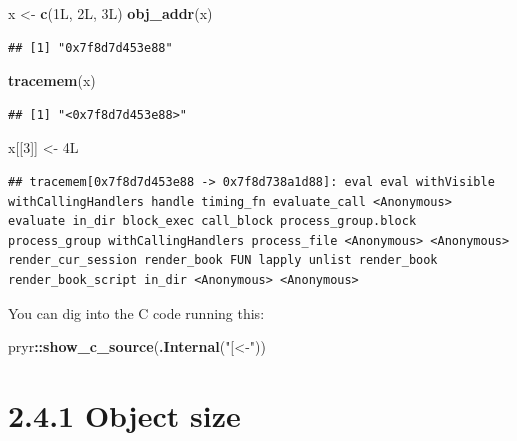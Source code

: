 \documentclass[]{book}
\newenvironment{Shaded}{\begin{snugshade}}{\end{snugshade}}
\newcommand{\DecValTok}[1]{\textcolor[rgb]{0.00,0.00,0.81}{#1}}
\newcommand{\KeywordTok}[1]{\textcolor[rgb]{0.13,0.29,0.53}{\textbf{#1}}}
\newcommand{\NormalTok}[1]{#1}
\newcommand{\OperatorTok}[1]{\textcolor[rgb]{0.81,0.36,0.00}{\textbf{#1}}}
\newcommand{\StringTok}[1]{\textcolor[rgb]{0.31,0.60,0.02}{#1}}
\begin{document}
\begin{Shaded}
\begin{Highlighting}[]
\NormalTok{x <-}\StringTok{ }\KeywordTok{c}\NormalTok{(1L, 2L, 3L)}
\KeywordTok{obj_addr}\NormalTok{(x)}
\end{Highlighting}
\end{Shaded}

\begin{verbatim}
## [1] "0x7f8d7d453e88"
\end{verbatim}

\begin{Shaded}
\begin{Highlighting}[]
\KeywordTok{tracemem}\NormalTok{(x)}
\end{Highlighting}
\end{Shaded}

\begin{verbatim}
## [1] "<0x7f8d7d453e88>"
\end{verbatim}

\begin{Shaded}
\begin{Highlighting}[]
\NormalTok{x[[}\DecValTok{3}\NormalTok{]] <-}\StringTok{ }\NormalTok{4L}
\end{Highlighting}
\end{Shaded}

\begin{verbatim}
## tracemem[0x7f8d7d453e88 -> 0x7f8d738a1d88]: eval eval withVisible withCallingHandlers handle timing_fn evaluate_call <Anonymous> evaluate in_dir block_exec call_block process_group.block process_group withCallingHandlers process_file <Anonymous> <Anonymous> render_cur_session render_book FUN lapply unlist render_book render_book_script in_dir <Anonymous> <Anonymous>
\end{verbatim}

You can dig into the C code running this:

\begin{Shaded}
\begin{Highlighting}[]
\NormalTok{pryr}\OperatorTok{::}\KeywordTok{show_c_source}\NormalTok{(}\KeywordTok{.Internal}\NormalTok{(}\StringTok{"[<-"}\NormalTok{))}
\end{Highlighting}
\end{Shaded}

\hypertarget{object-size}{%
\section*{2.4.1 Object size}\label{object-size}}
\end{document}
